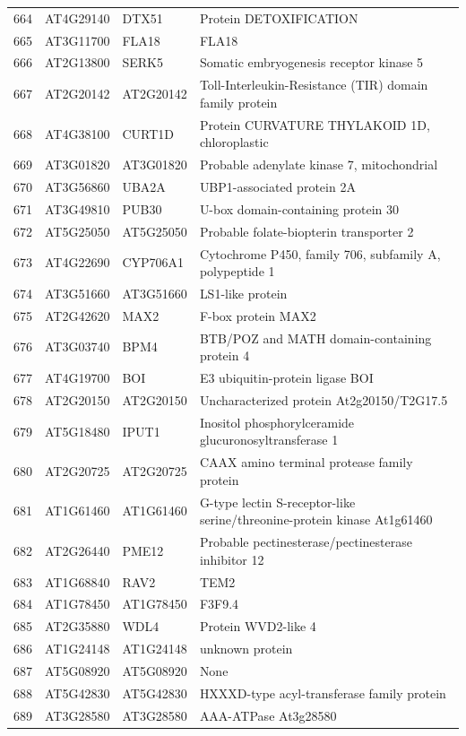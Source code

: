 \documentclass[11pt]{article}
\begin{document}
\begin{center}
\begin{tabular}{rlll}
664 & AT4G29140 & DTX51 & Protein DETOXIFICATION\\
665 & AT3G11700 & FLA18 & FLA18\\
666 & AT2G13800 & SERK5 & Somatic embryogenesis receptor kinase 5\\
667 & AT2G20142 & AT2G20142 & Toll-Interleukin-Resistance (TIR) domain family protein\\
668 & AT4G38100 & CURT1D & Protein CURVATURE THYLAKOID 1D, chloroplastic\\
669 & AT3G01820 & AT3G01820 & Probable adenylate kinase 7, mitochondrial\\
670 & AT3G56860 & UBA2A & UBP1-associated protein 2A\\
671 & AT3G49810 & PUB30 & U-box domain-containing protein 30\\
672 & AT5G25050 & AT5G25050 & Probable folate-biopterin transporter 2\\
673 & AT4G22690 & CYP706A1 & Cytochrome P450, family 706, subfamily A, polypeptide 1\\
674 & AT3G51660 & AT3G51660 & LS1-like protein\\
675 & AT2G42620 & MAX2 & F-box protein MAX2\\
676 & AT3G03740 & BPM4 & BTB/POZ and MATH domain-containing protein 4\\
677 & AT4G19700 & BOI & E3 ubiquitin-protein ligase BOI\\
678 & AT2G20150 & AT2G20150 & Uncharacterized protein At2g20150/T2G17.5\\
679 & AT5G18480 & IPUT1 & Inositol phosphorylceramide glucuronosyltransferase 1\\
680 & AT2G20725 & AT2G20725 & CAAX amino terminal protease family protein\\
681 & AT1G61460 & AT1G61460 & G-type lectin S-receptor-like serine/threonine-protein kinase At1g61460\\
682 & AT2G26440 & PME12 & Probable pectinesterase/pectinesterase inhibitor 12\\
683 & AT1G68840 & RAV2 & TEM2\\
684 & AT1G78450 & AT1G78450 & F3F9.4\\
685 & AT2G35880 & WDL4 & Protein WVD2-like 4\\
686 & AT1G24148 & AT1G24148 & unknown protein\\
687 & AT5G08920 & AT5G08920 & None\\
688 & AT5G42830 & AT5G42830 & HXXXD-type acyl-transferase family protein\\
689 & AT3G28580 & AT3G28580 & AAA-ATPase At3g28580\\

\end{tabular}
\end{center}
\end{document}
